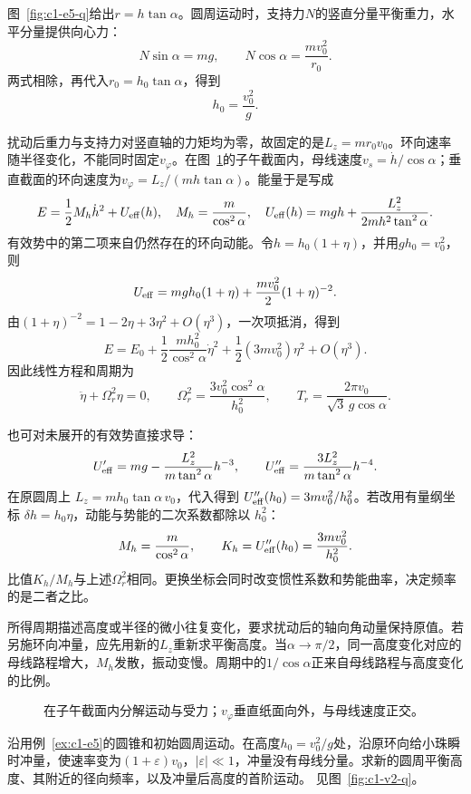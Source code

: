 \begin{solution}
图~\ref{fig:c1-e5-q}给出$r=h\tan\alpha$。圆周运动时，支持力$N$的竖直分量平衡重力，水平分量提供向心力：
\[N\sin\alpha=mg,\qquad N\cos\alpha=\frac{mv_0^2}{r_0}.
\]
两式相除，再代入$r_0=h_0\tan\alpha$，得到
\[\boxed{h_0=\frac{v_0^2}{g}}.\]

扰动后重力与支持力对竖直轴的力矩均为零，故固定的是$L_z=mr_0v_0$。环向速率随半径变化，不能同时固定$v_\varphi$。在图~\ref{fig:c1-e5-s}的子午截面内，母线速度$v_s=\dot h/\cos\alpha$；垂直截面的环向速度为$v_\varphi=L_z/(mh\tan\alpha)$。能量于是写成
\[E=\frac12 M_h\dot h^2+U_{\rm eff}(h),\quad
M_h=\frac m{\cos^2\alpha},\quad
U_{\rm eff}(h)=mgh+\frac{L_z^2}{2m h^2\tan^2\alpha}.\]
有效势中的第二项来自仍然存在的环向动能。令$h=h_0(1+\eta)$，并用$gh_0=v_0^2$，则
\[U_{\rm eff}=mgh_0(1+\eta)+\frac{mv_0^2}{2}(1+\eta)^{-2}.
\]
由$(1+\eta)^{-2}=1-2\eta+3\eta^2+O(\eta^3)$，一次项抵消，得到
\[E=E_0+\frac12\frac{mh_0^2}{\cos^2\alpha}\dot\eta^2
+\frac12(3mv_0^2)\eta^2+O(\eta^3).\]
因此线性方程和周期为
\[\ddot\eta+\Omega_r^2\eta=0,\qquad
\Omega_r^2=\frac{3v_0^2\cos^2\alpha}{h_0^2},\qquad
\boxed{T_r=\frac{2\pi v_0}{\sqrt3\,g\cos\alpha}}.\]

也可对未展开的有效势直接求导：
\[
U_{\rm eff}'=mg-\frac{L_z^2}{m\tan^2\alpha}h^{-3},\qquad
U_{\rm eff}''=\frac{3L_z^2}{m\tan^2\alpha}h^{-4}.
\]
在原圆周上 $L_z=mh_0\tan\alpha\,v_0$，代入得到 $U_{\rm eff}''(h_0)=3mv_0^2/h_0^2$。若改用有量纲坐标 $\delta h=h_0\eta$，动能与势能的二次系数都除以 $h_0^2$：
\[M_h=\frac m{\cos^2\alpha},\qquad
K_h=U_{\rm eff}''(h_0)=\frac{3mv_0^2}{h_0^2}.
\]
比值$K_h/M_h$与上述$\Omega_r^2$相同。更换坐标会同时改变惯性系数和势能曲率，决定频率的是二者之比。

所得周期描述高度或半径的微小往复变化，要求扰动后的轴向角动量保持原值。若另施环向冲量，应先用新的$L_z$重新求平衡高度。当$\alpha\to\pi/2$，同一高度变化对应的母线路程增大，$M_h$发散，振动变慢。周期中的$1/\cos\alpha$正来自母线路程与高度变化的比例。

\begin{figure}[H]\centering
{}
\caption{在子午截面内分解运动与受力；$v_\varphi$垂直纸面向外，与母线速度正交。}\label{fig:c1-e5-s}
\end{figure}
\end{solution}
\begin{exercise}[圆锥上受到环向冲量的小珠]\label{ex:c1-v2}

沿用例~\ref{ex:c1-e5}的圆锥和初始圆周运动。在高度$h_0=v_0^2/g$处，沿原环向给小珠瞬时冲量，使速率变为$(1+\varepsilon)v_0$，$|\varepsilon|\ll1$，冲量没有母线分量。求新的圆周平衡高度、其附近的径向频率，以及冲量后高度的首阶运动。 见图~\ref{fig:c1-v2-q}。
\end{exercise}

